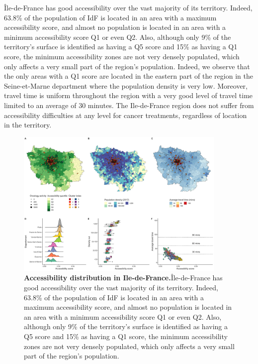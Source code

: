 Île-de-France has good accessibility over the vast majority of its territory.
Indeed, 63.8\% of the population of IdF is located in an area with a maximum
accessibility score, and almost no population is located in an area with a
minimum accessibility score Q1 or even Q2. Also, although only 9\% of the
territory's surface is identified as having a Q5 score and 15\% as having a Q1
score, the minimum accessibility zones are not very densely populated, which
only affects a very small part of the region's population. Indeed, we observe
that the only areas with a Q1 score are located in the eastern part of the
region in the Seine-et-Marne department where the population density is very
low. Moreover, travel time is uniform throughout the region with a very good
level of travel time limited to an average of 30 minutes. The Ile-de-France
region does not suffer from accessibility difficulties at any level for cancer
treatments, regardless of location in the territory.

\begin{figure}[H]
    \includegraphics[width=0.9\textwidth]{images/camion/region_accessibility/accessibility_Ile-de-France.png}
    \centering
    \caption{
        \textbf{Accessibility distribution in Ile-de-France.}Île-de-France has good accessibility over the vast majority of its territory.
        Indeed, 63.8\% of the population of IdF is located in an area with a maximum
        accessibility score, and almost no population is located in an area with a
        minimum accessibility score Q1 or even Q2. Also, although only 9\% of the
        territory's surface is identified as having a Q5 score and 15\% as having a Q1
        score, the minimum accessibility zones are not very densely populated, which
        only affects a very small part of the region's population.
    }
\end{figure}

